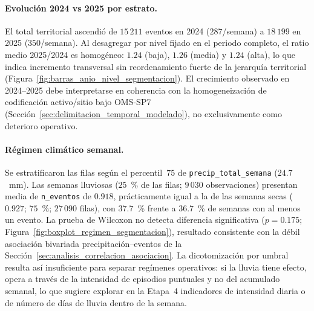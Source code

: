     
    
    \paragraph{Evolución 2024 vs 2025 por estrato.} El total territorial ascendió de $15\,211$ eventos en 2024 ($287$/semana) a $18\,199$ en 2025 ($350$/semana). Al desagregar por nivel fijado en el periodo completo, el ratio medio 2025/2024 es homogéneo: $1{.}24$ (baja), $1{.}26$ (media) y $1{.}24$ (alta), lo que indica incremento transversal sin reordenamiento fuerte de la jerarquía territorial (Figura~\ref{fig:barras_anio_nivel_segmentacion}). El crecimiento observado en 2024--2025 debe interpretarse en coherencia con la homogeneización de codificación activo/sitio bajo OMS-SP7 (Sección~\ref{sec:delimitacion_temporal_modelado}), no exclusivamente como deterioro operativo.
    
    
    \paragraph{Régimen climático semanal.} Se estratificaron las filas según el percentil~$75$ de \texttt{precip\_total\_semana} ($24{.}7$~mm). Las semanas lluviosas ($25$~\% de las filas; $9\,030$ observaciones) presentan media de \texttt{n\_eventos} de $0{.}918$, prácticamente igual a la de las semanas secas ($0{.}927$; $75$~\%; $27\,090$ filas), con $37{.}7$~\% frente a $36{.}7$~\% de semanas con al menos un evento. La prueba de Wilcoxon no detecta diferencia significativa ($p = 0{.}175$; Figura~\ref{fig:boxplot_regimen_segmentacion}), resultado consistente con la débil asociación bivariada precipitación--eventos de la Sección~\ref{sec:analisis_correlacion_asociacion}. La dicotomización por umbral resulta así insuficiente para separar regímenes operativos: si la lluvia tiene efecto, opera a través de la intensidad de episodios puntuales y no del acumulado semanal, lo que sugiere explorar en la Etapa~4 indicadores de intensidad diaria o de número de días de lluvia dentro de la semana.
    
    
